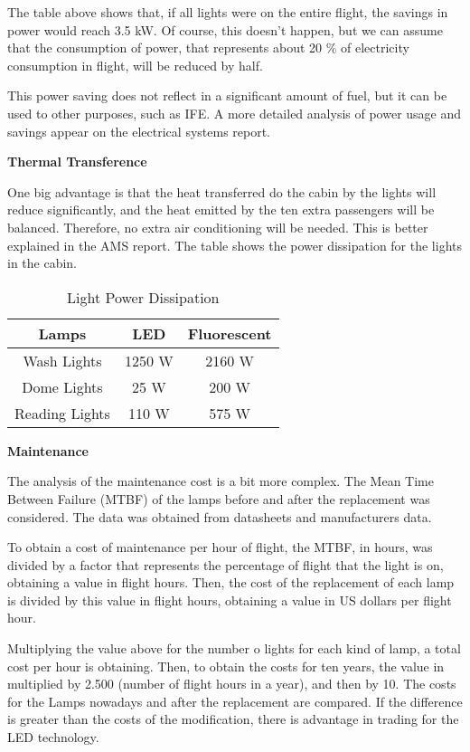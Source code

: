 The table above shows that, if all lights were on the entire flight, the savings in power would reach 3.5 kW. Of course, this doesn't happen, but we can assume that the consumption of power, that represents about 20 \% of electricity consumption in flight, will be reduced by half.

This power saving does not reflect in a significant amount of fuel, but it can be used to other purposes, such as IFE. A more detailed analysis of power usage and savings appear on the electrical systems report.

\textbf{Thermal Transference}

One big advantage is that the heat transferred do the cabin by the lights will reduce significantly, and the heat emitted by the ten extra passengers will be balanced. Therefore, no extra air conditioning will be needed. This is better explained in the AMS report. The table shows the power dissipation for the lights in the cabin.

\begin{table}[htbp]
  \centering
  \caption{Light Power Dissipation}
    \begin{tabular}{ccc}
    \toprule
    Lamps & LED   & Fluorescent \\
    \midrule
    Wash Lights & 1250 W & 2160 W \\
    Dome Lights & 25 W  & 200 W \\
    Reading Lights & 110 W & 575 W \\
    \bottomrule
    \end{tabular}%
  \label{tab:LightDissipation}%
\end{table}%


\textbf{Maintenance}

The analysis of the maintenance cost is a bit more complex. The Mean Time Between Failure (MTBF) of the lamps before and after the replacement was considered. The data was obtained from datasheets and manufacturers data.

To obtain a cost of maintenance per hour of flight, the MTBF, in hours, was divided by a factor that represents the percentage of flight that the light is on, obtaining a value in flight hours. Then, the cost of the replacement of each lamp is divided by this value in flight hours, obtaining a value in US dollars per flight hour.

Multiplying the value above for the number o lights for each kind of lamp, a total cost per hour is obtaining. Then, to obtain the costs for ten years, the value in multiplied by 2.500 (number of flight hours in a year), and then by 10. The costs for the Lamps nowadays and after the replacement are compared. If the difference is greater than the costs of the modification, there is advantage in trading for the LED technology.

